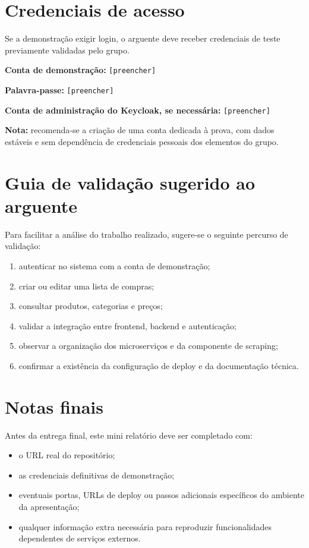 \documentclass[a4paper,11pt]{article}
\begin{document}
\section{Credenciais de acesso}

Se a demonstra\c{c}\~ao exigir login, o arguente deve receber credenciais de teste previamente validadas pelo grupo.

\textbf{Conta de demonstra\c{c}\~ao:} \texttt{[preencher]}

\textbf{Palavra-passe:} \texttt{[preencher]}

\textbf{Conta de administra\c{c}\~ao do Keycloak, se necess\'aria:} \texttt{[preencher]}

\textbf{Nota:} recomenda-se a cria\c{c}\~ao de uma conta dedicada \`a prova, com dados est\'aveis e sem depend\^encia de credenciais pessoais dos elementos do grupo.

\section{Guia de valida\c{c}\~ao sugerido ao arguente}

Para facilitar a an\'alise do trabalho realizado, sugere-se o seguinte percurso de valida\c{c}\~ao:

\begin{enumerate}[leftmargin=1.8em]
    \item autenticar no sistema com a conta de demonstra\c{c}\~ao;
    \item criar ou editar uma lista de compras;
    \item consultar produtos, categorias e pre\c{c}os;
    \item validar a integra\c{c}\~ao entre frontend, backend e autentica\c{c}\~ao;
    \item observar a organiza\c{c}\~ao dos microservi\c{c}os e da componente de scraping;
    \item confirmar a exist\^encia da configura\c{c}\~ao de deploy e da documenta\c{c}\~ao t\'ecnica.
\end{enumerate}

\section{Notas finais}

Antes da entrega final, este mini relat\'orio deve ser completado com:

\begin{itemize}[leftmargin=1.8em]
    \item o URL real do reposit\'orio;
    \item as credenciais definitivas de demonstra\c{c}\~ao;
    \item eventuais portas, URLs de deploy ou passos adicionais espec\'ificos do ambiente da apresenta\c{c}\~ao;
    \item qualquer informa\c{c}\~ao extra necess\'aria para reproduzir funcionalidades dependentes de servi\c{c}os externos.
\end{itemize}
\end{document}
